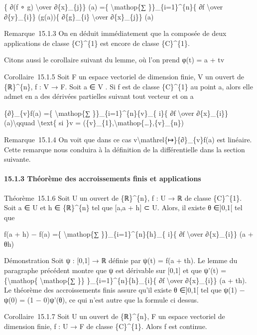 \documentclass[]{article}
\begin{document}
\{ ∂(f ∘ g) \textbackslash{}over ∂\{x\}\_\{j\}\} (a) =\{
\textbackslash{}mathop\{∑ \}\}\_\{i=1\}\^{}\{n\}\{ ∂f
\textbackslash{}over ∂\{y\}\_\{i\}\} (g(a))\{ ∂\{g\}\_\{i\}
\textbackslash{}over ∂\{x\}\_\{j\}\} (a)

Remarque~15.1.3 On en déduit immédiatement que la composée de deux
applications de classe \{C\}\^{}\{1\} est encore de classe
\{C\}\^{}\{1\}.

Citons aussi le corollaire suivant du lemme, où l'on prend φ(t) = a + tv

Corollaire~15.1.5 Soit F un espace vectoriel de dimension finie, V un
ouvert de \{ℝ\}\^{}\{n\}, f : V → F. Soit a ∈ V . Si f est de classe
\{C\}\^{}\{1\} au point a, alors elle admet en a des dérivées partielles
suivant tout vecteur et on a

\{∂\}\_\{v\}f(a) =\{ \textbackslash{}mathop\{∑
\}\}\_\{i=1\}\^{}\{n\}\{v\}\_\{ i\}\{ ∂f \textbackslash{}over
∂\{x\}\_\{i\}\} (a)\textbackslash{}qquad \textbackslash{}text\{ si \}v =
(\{v\}\_\{1\},\textbackslash{}mathop\{\ldots{}\},\{v\}\_\{n\})

Remarque~15.1.4 On voit que dans ce cas
v\textbackslash{}mathrel\{↦\}\{∂\}\_\{v\}f(a) est linéaire. Cette
remarque nous conduira à la définition de la différentielle dans la
section suivante.

\paragraph{15.1.3 Théorème des accroissements finis et applications}

Théorème~15.1.6 Soit U un ouvert de \{ℝ\}\^{}\{n\}, f : U → ℝ de classe
\{C\}\^{}\{1\}. Soit a ∈ U et h ∈ \{ℝ\}\^{}\{n\} tel que {[}a,a + h{]} ⊂
U. Alors, il existe θ ∈{]}0,1{[} tel que

f(a + h) − f(a) =\{ \textbackslash{}mathop\{∑
\}\}\_\{i=1\}\^{}\{n\}\{h\}\_\{ i\}\{ ∂f \textbackslash{}over
∂\{x\}\_\{i\}\} (a + θh)

Démonstration Soit ψ : {[}0,1{]} → ℝ définie par ψ(t) = f(a + th). Le
lemme du paragraphe précédent montre que ψ est dérivable sur {[}0,1{]}
et que ψ'(t) =\{\textbackslash{}mathop\{ \textbackslash{}mathop\{∑ \}\}
\}\_\{i=1\}\^{}\{n\}\{h\}\_\{i\}\{ ∂f \textbackslash{}over
∂\{x\}\_\{i\}\} (a + th). Le théorème des accroissements finis assure
qu'il existe θ ∈{]}0,1{[} tel que ψ(1) − ψ(0) = (1 − 0)ψ'(θ), ce qui
n'est autre que la formule ci dessus.

Corollaire~15.1.7 Soit U un ouvert de \{ℝ\}\^{}\{n\}, F un espace
vectoriel de dimension finie, f : U → F de classe \{C\}\^{}\{1\}. Alors
f est continue.
\end{document}
